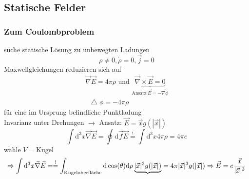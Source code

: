 \documentclass[a4paper]{article}
\newcommand*\laplace{\mathop{}\!\mathbin\bigtriangleup}
\begin{document}
\subsection{Statische Felder}
\subsubsection{Zum Coulombproblem}
suche statische Lösung zu unbewegten Ladungen
\begin{equation}
\rho\neq0,\dot{\rho}=0,\vec{j}=0
\end{equation}
Maxwellgleichungen reduzieren sich auf 
\begin{align}
\vec{\nabla}\vec{E}=4\pi\rho \text{ und }
\underbrace{\vec{\nabla}\times\vec{E}=0}_{\text{Ansatz:}
\vec{E}=-\vec{\nabla}\phi}\\
\laplace\phi=-4\pi\rho
\end{align}
für eine im Ursprung befindliche Punktladung\\
Invarianz unter Drehungen $\rightarrow$ Ansatz: $\vec{E}=\vec{x}g(|\vec{x}|)$
\begin{equation}
\int \mathrm{d}^3x \vec{\nabla}\vec{E}=\oint \mathrm{d}\vec{f} \vec{E} \overset{!}{=}  \int
\mathrm{d}^3x4\pi\rho=4\pi e
\end{equation} 
wähle $V=$Kugel 
\begin{equation}
\Rightarrow \int \mathrm{d}^3x
\vec{\nabla}\vec{E}=\overset{!}{=}\int_\text{Kugeloberfläche} \mathrm{d}\cos(\theta)\mathrm{d}\rho
\underbrace{|\vec{x}|^3 g(|\vec{x}|)}=4\pi|\vec{x}|^3 g(|\vec{x}|)\\
\Rightarrow \vec{E}=e\frac{\vec{x}}{|\vec{x}|^3}
\end{equation}
\end{document}
